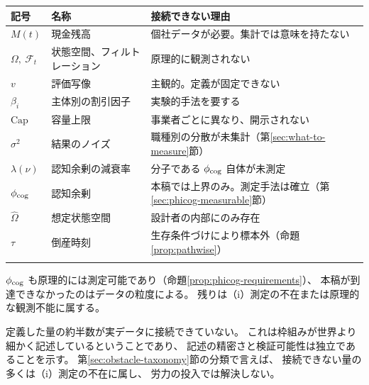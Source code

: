 \begin{center}
\begin{tabularx}{\textwidth}{@{}llX@{}}
\toprule
記号 & 名称 & 接続できない理由 \\
\midrule
$M(t)$ & 現金残高 & 個社データが必要。集計では意味を持たない \\
$\Omega,\ \mathcal{F}_t$ & 状態空間、フィルトレーション & 原理的に観測されない \\
$v$ & 評価写像 & 主観的。定義が固定できない \\
$\beta_i$ & 主体別の割引因子 & 実験的手法を要する \\
$\mathrm{Cap}$ & 容量上限 & 事業者ごとに異なり、開示されない \\
$\sigma^2$ & 結果のノイズ & 職種別の分散が未集計（第\ref{sec:what-to-measure}節） \\
$\lambda(\nu)$ & 認知余剰の減衰率 & 分子である $\phi_{\rm cog}$ 自体が未測定 \\
$\phi_{\rm cog}$ & 認知余剰 & 本稿では上界のみ。測定手法は確立（第\ref{sec:phicog-measurable}節） \\
$\hat\Omega$ & 想定状態空間 & 設計者の内部にのみ存在 \\
$\tau$ & 倒産時刻 & 生存条件づけにより標本外（命題\ref{prop:pathwise}） \\
& & \\
\bottomrule
\end{tabularx}
\label{tab:unmeasured-quantities}
\end{center}

$\phi_{\rm cog}$ も原理的には測定可能であり（命題\ref{prop:phicog-requirements}）、
本稿が到達できなかったのはデータの粒度による。
残りは（i）測定の不在または原理的な観測不能に属する。

\begin{remark}[枠組みの過剰さ]
定義した量の約半数が実データに接続できていない。
これは枠組みが世界より細かく記述しているということであり、
記述の精密さと検証可能性は独立であることを示す。
第\ref{sec:obstacle-taxonomy}節の分類で言えば、
接続できない量の多くは（i）測定の不在に属し、
労力の投入では解決しない。
\end{remark}
